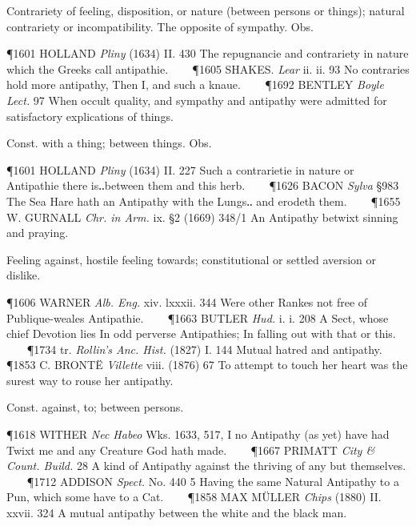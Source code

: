 \begin{description}[wide, labelwidth=!, labelindent=0pt]
\noindent {}

\vspace{-0.3cm}

\begin{myenumerate}
 Contrariety of feeling, disposition, or nature (between persons or things); natural contrariety or incompatibility. The opposite of sympathy. Obs.

\P 1601 HOLLAND  \textit{Pliny} (1634) II. 430 The repugnancie and contrariety in nature which the Greeks call antipathie.    
\P 1605 SHAKES.  \textit{Lear} ii. ii. 93 No contraries hold more antipathy, Then I, and such a knaue.    
\P 1692 BENTLEY  \textit{Boyle Lect.} 97 When occult quality, and sympathy and antipathy were admitted for satisfactory explications of things.

 Const. with a thing; between things. Obs.

\P 1601 HOLLAND  \textit{Pliny} (1634) II. 227 Such a contrarietie in nature or Antipathie there is‥between them and this herb.    
\P 1626 BACON  \textit{Sylva} §983 The Sea Hare hath an Antipathy with the Lungs‥ and erodeth them.    
\P 1655 W. GURNALL  \textit{Chr. in Arm.} ix. §2 (1669) 348/1 An Antipathy betwixt sinning and praying.

 Feeling against, hostile feeling towards; constitutional or settled aversion or dislike.

\P 1606 WARNER  \textit{Alb. Eng.} xiv. lxxxii. 344 Were other Rankes not free of Publique-weales Antipathie.    
\P 1663 BUTLER  \textit{Hud.} i. i. 208 A Sect, whose chief Devotion lies In odd perverse Antipathies; In falling out with that or this.    
\P 1734 tr.  \textit{Rollin's Anc. Hist.} (1827) I. 144 Mutual hatred and antipathy.    
\P 1853 C. BRONTË  \textit{Villette} viii. (1876) 67 To attempt to touch her heart was the surest way to rouse her antipathy.

 Const. against, to; between persons.

\P 1618 WITHER  \textit{Nec Habeo} Wks. 1633, 517, I no Antipathy (as yet) have had Twixt me and any Creature God hath made.    
\P 1667 PRIMATT  \textit{City \& Count. Build.} 28 A kind of Antipathy against the thriving of any but themselves.    
\P 1712 ADDISON  \textit{Spect.} No. 440 5 Having the same Natural Antipathy to a Pun, which some have to a Cat.    
\P 1858 MAX MÜLLER  \textit{Chips} (1880) II. xxvii. 324 A mutual antipathy between the white and the black man.


\end{myenumerate}
\end{description}
